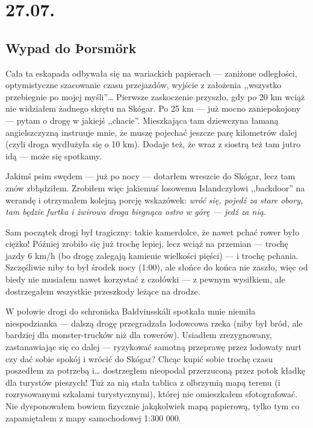\chapter*{27.07.}

\section*{Wypad do Þorsmörk}


Cała ta eskapada odbywała się na wariackich papierach --- zaniżone odległości, optymistyczne szacowanie czasu przejazdów, wyjście z założenia ,,wszystko przebiegnie po mojej myśli''… Pierwsze zaskoczenie przyszło, gdy po 20 km wciąż nie widziałem żadnego skrętu na Skógar. Po 25 km --- już mocno zaniepokojony --- pytam o drogę w jakiejś ,,chacie''. Mieszkająca tam dziewczyna łamaną angielszczyzną instruuje mnie, że muszę pojechać jeszcze parę kilometrów dalej (czyli droga wydłużyła się o 10 km). Dodaje też, że wraz z siostrą też tam jutro idą --- może się spotkamy.

Jakimś psim swędem --- już po nocy --- dotarłem wreszcie do Skógar, lecz tam znów zbłądziłem. Zrobiłem więc jakiemuś losowemu Islandczylowi ,,backdoor'' na werandę i otrzymałem kolejną porcję wskazówek: \emph{wróć się, pojedź za stare obory, tam będzie furtka i żwirowa droga biegnąca ostro w górę --- jedź za nią}.

Sam początek drogi był tragiczny: takie kamerdolce, że nawet pchać rower było ciężko! Później zrobiło się już trochę lepiej, lecz wciąż na przemian --- trochę jazdy 6 km/h (bo drogę zalegają kamienie wielkości pięści) --- i trochę pchania. Szczęśliwie niby to był środek nocy (1:00), ale słońce do końca nie zaszło, więc od biedy nie musiałem nawet korzystać z czołówki --- z pewnym wysiłkiem, ale dostrzegałem wszystkie przeszkody leżące na drodze.

W połowie drogi do schroniska Baldvinsskáli spotkała mnie niemiła niespodzianka --- dalszą drogę przegradzała lodowcowa rzeka (niby był bród, ale bardziej dla monster-trucków niż dla rowerów). Usiadłem zrezygnowany, zastanawiając się co dalej --- ryzykować samotną przeprawę przez lodowaty nurt czy dać sobie spokój i wrócić do Skógar? Chcąc kupić sobie trochę czasu poszedłem za potrzebą i… dostrzegłem nieopodal przerzuconą przez potok kładkę dla turystów pieszych! Tuż za nią stała tablica z olbrzymią mapą terenu (i rozrysowanymi szkalami turystycznymi), której nie omieszkałem sfotografować. Nie dysponowałem bowiem fizycznie jakąkolwiek mapą papierową, tylko tym co zapamiętałem z mapy samochodowej 1:300 000.

